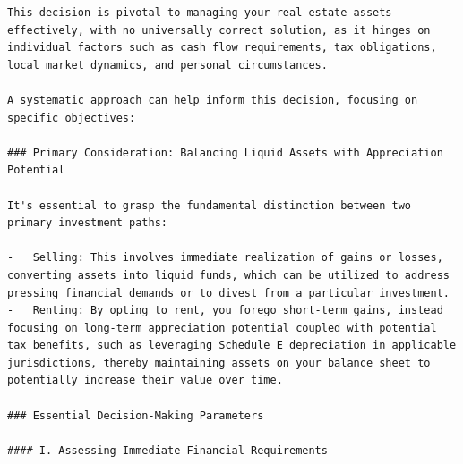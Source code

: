 \begin{Verbatim}
This decision is pivotal to managing your real estate assets effectively, with no universally correct solution, as it hinges on individual factors such as cash flow requirements, tax obligations, local market dynamics, and personal circumstances.

A systematic approach can help inform this decision, focusing on specific objectives:

### Primary Consideration: Balancing Liquid Assets with Appreciation Potential

It's essential to grasp the fundamental distinction between two primary investment paths:

-   Selling: This involves immediate realization of gains or losses, converting assets into liquid funds, which can be utilized to address pressing financial demands or to divest from a particular investment.
-   Renting: By opting to rent, you forego short-term gains, instead focusing on long-term appreciation potential coupled with potential tax benefits, such as leveraging Schedule E depreciation in applicable jurisdictions, thereby maintaining assets on your balance sheet to potentially increase their value over time.

### Essential Decision-Making Parameters

#### I. Assessing Immediate Financial Requirements


\end{Verbatim}

